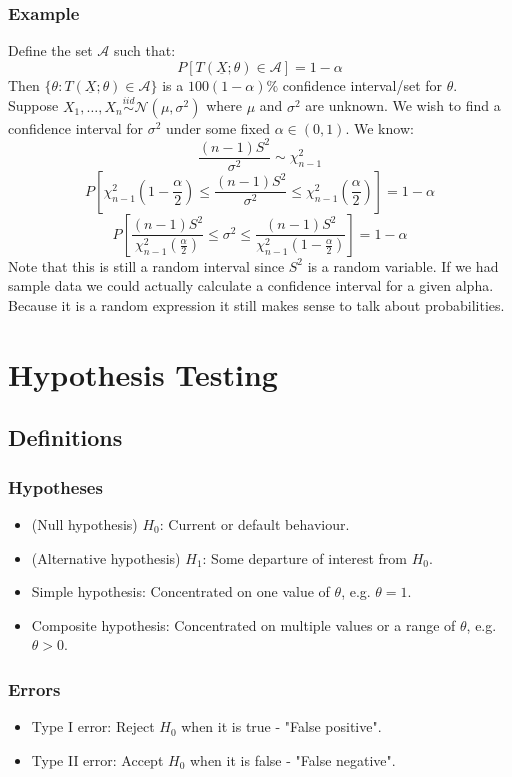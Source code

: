 \documentclass[12pt]{article}
\newcommand{\iid}{\overset{iid}{\sim}}
\begin{document}
\subsubsection*{Example}
Define the set \(\mathcal{A}\) such that:
\[P[T(\underline{X};\theta)\in\mathcal{A}]=1-\alpha\]
Then \(\{\theta: T(\underline{X};\theta)\in\mathcal{A}\}\) is a \(100(1-\alpha)\%\) confidence interval/set for \(\theta\). Suppose \(X_1,\dots,X_n\iid\mathcal{N}(\mu,\sigma^2)\) where \(\mu\) and \(\sigma^2\) are unknown. We wish to find a confidence interval for \(\sigma^2\) under some fixed \(\alpha\in(0,1)\). We know:
\[\frac{(n-1)S^2}{\sigma^2}\sim\chi^2_{n-1}\]
\[P\left[\chi^2_{n-1}\left(1-\frac{\alpha}{2}\right)\leq\frac{(n-1)S^2}{\sigma^2}\leq\chi^2_{n-1}\left(\frac{\alpha}{2}\right)\right]=1-\alpha\]
\[P\left[\frac{(n-1)S^2}{\chi^2_{n-1}\left(\frac{\alpha}{2}\right)}\leq\sigma^2\leq\frac{(n-1)S^2}{\chi^2_{n-1}\left(1-\frac{\alpha}{2}\right)}\right]=1-\alpha\]
Note that this is still a random interval since \(S^2\) is a random variable. If we had sample data we could actually calculate a confidence interval for a given alpha. Because it is a random expression it still makes sense to talk about probabilities.
\clearpage
\section{Hypothesis Testing}
\subsection{Definitions}
\subsubsection{Hypotheses}
\begin{itemize}
    \item (Null hypothesis) \(H_0\): Current or default behaviour.
    \item (Alternative hypothesis) \(H_1\): Some departure of interest from \(H_0\).
    \item Simple hypothesis: Concentrated on one value of \(\theta\), e.g. \(\theta=1\).
    \item Composite hypothesis: Concentrated on multiple values or a range of \(\theta\), e.g. \(\theta>0\).
\end{itemize}
\subsubsection{Errors}
\begin{itemize}
    \item Type I error: Reject \(H_0\) when it is true - "False positive".
    \item Type II error: Accept \(H_0\) when it is false - "False negative".
\end{itemize}
\end{document}
